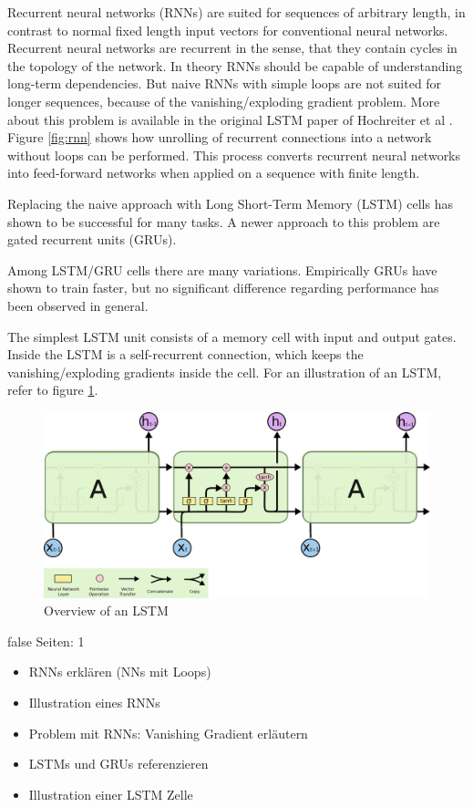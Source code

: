 \documentclass[draft,final,oneside]{vutinfth} %
\begin{document}
Recurrent neural networks (RNNs) are suited for sequences of arbitrary length, in contrast to normal fixed length input vectors for conventional neural networks. Recurrent neural networks are recurrent in the sense, that they contain cycles in the topology of the network. In theory RNNs should be capable of understanding long-term dependencies. But naive RNNs with simple loops are not suited for longer sequences, because of the vanishing/exploding gradient problem. More about this problem is available in the original LSTM paper of Hochreiter et al \cite{hochreiter}. Figure \ref{fig:rnn} shows how unrolling of recurrent connections into a network without loops can be performed. This process converts  recurrent neural networks into feed-forward networks when applied on a sequence with finite length.

Replacing the naive approach with Long Short-Term Memory (LSTM) cells has shown to be successful for many tasks. A newer approach to this problem are gated recurrent units (GRUs). \cite{gru}

Among LSTM/GRU cells there are many variations. Empirically GRUs have shown to train faster, but no significant difference regarding performance has been observed in general.

The simplest LSTM unit consists of a memory cell with input and output gates. Inside the LSTM is a self-recurrent connection, which keeps the vanishing/exploding gradients inside the cell. For an illustration of an LSTM, refer to figure \ref{fig:lstm}.

\begin{figure}[ht]
	\centering
  	\includegraphics[width=1.0\textwidth]{graphics/lstm.png}
	\caption{Overview of an LSTM \cite{colahlstm}}
	\label{fig:lstm}
\end{figure}



\if false
Seiten: 1
\begin{itemize}

\item RNNs erklären (NNs mit Loops)
\item Illustration eines RNNs
\item Problem mit RNNs: Vanishing Gradient erläutern
\item LSTMs und GRUs referenzieren
\item Illustration einer LSTM Zelle

\end{itemize}
\fi
\end{document}
